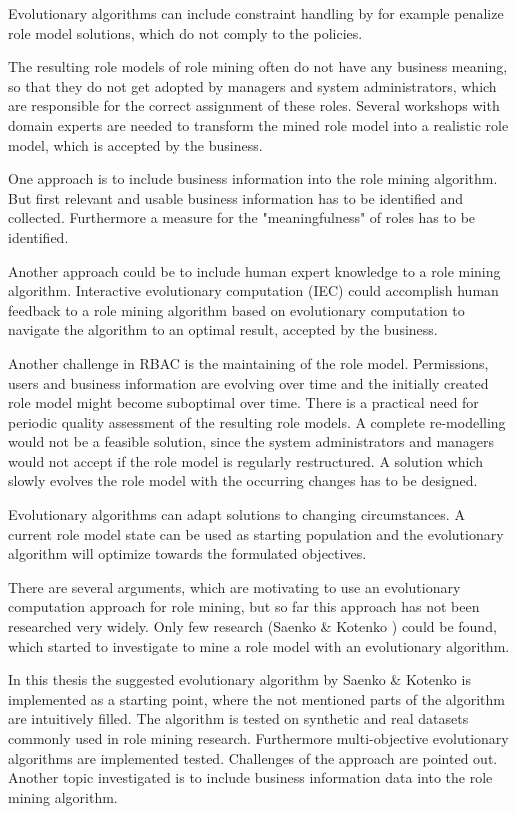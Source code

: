Evolutionary algorithms can include constraint handling by for example penalize role model solutions, which do not comply to the policies. 

The resulting role models of role mining often do not have any business meaning, so that they do not get adopted by managers and system administrators, which are responsible for the correct assignment of these roles. Several workshops with domain experts are needed to transform the mined role model into a realistic role model, which is accepted by the business.

One approach is to include business information into the role mining algorithm. But first relevant and usable business information has to be identified and collected. Furthermore a measure for the "meaningfulness" of roles has to be identified.

Another approach could be to include human expert knowledge to a role mining algorithm. Interactive evolutionary computation (IEC)\cite{949485} could accomplish human feedback to a role mining algorithm based on evolutionary computation to navigate the algorithm to an optimal result, accepted by the business.

Another challenge in RBAC is the maintaining of the role model. Permissions, users and business information are evolving over time and the initially created role model might become suboptimal over time. There is a practical need for periodic quality assessment of the resulting role models\cite{Kunz}. A complete re-modelling would not be a feasible solution, since the system administrators and managers would not accept if the role model is regularly restructured. A solution which slowly evolves the role model with the occurring changes has to be designed.

Evolutionary algorithms can adapt solutions to changing circumstances\cite{Fogel:1997}. A current role model state can be used as starting population and the evolutionary algorithm will optimize towards the formulated objectives.

There are several arguments, which are motivating to use an evolutionary computation approach for role mining, but so far this approach has not been researched very widely. Only few research (Saenko \& Kotenko \cite{Igor}\cite{saenko2012design}) could be found, which started to investigate to mine a role model with an evolutionary algorithm. 

In this thesis the suggested evolutionary algorithm by Saenko \& Kotenko is implemented as a starting point, where the not mentioned parts of the algorithm are intuitively filled. The algorithm is tested on synthetic and real datasets commonly used in role mining research. Furthermore multi-objective evolutionary algorithms are implemented tested. Challenges of the approach are pointed out. Another topic investigated is to include business information data into the role mining algorithm.

